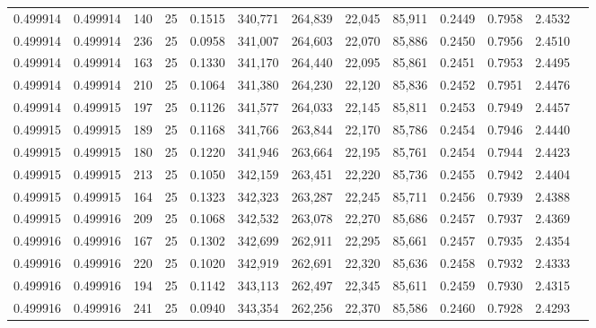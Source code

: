 \begin{tabular}{rrrrrrrrrrrrr}
0.499914 & 0.499914 &   140 &  25 &                                     0.1515 & 340,771 & 264,839 &  22,045 &  85,911 & 0.2449 & 0.7958 & 2.4532 \\
0.499914 & 0.499914 &   236 &  25 &                                     0.0958 & 341,007 & 264,603 &  22,070 &  85,886 & 0.2450 & 0.7956 & 2.4510 \\
0.499914 & 0.499914 &   163 &  25 &                                     0.1330 & 341,170 & 264,440 &  22,095 &  85,861 & 0.2451 & 0.7953 & 2.4495 \\
0.499914 & 0.499914 &   210 &  25 &                                     0.1064 & 341,380 & 264,230 &  22,120 &  85,836 & 0.2452 & 0.7951 & 2.4476 \\
0.499914 & 0.499915 &   197 &  25 &                                     0.1126 & 341,577 & 264,033 &  22,145 &  85,811 & 0.2453 & 0.7949 & 2.4457 \\
0.499915 & 0.499915 &   189 &  25 &                                     0.1168 & 341,766 & 263,844 &  22,170 &  85,786 & 0.2454 & 0.7946 & 2.4440 \\
0.499915 & 0.499915 &   180 &  25 &                                     0.1220 & 341,946 & 263,664 &  22,195 &  85,761 & 0.2454 & 0.7944 & 2.4423 \\
0.499915 & 0.499915 &   213 &  25 &                                     0.1050 & 342,159 & 263,451 &  22,220 &  85,736 & 0.2455 & 0.7942 & 2.4404 \\
0.499915 & 0.499915 &   164 &  25 &                                     0.1323 & 342,323 & 263,287 &  22,245 &  85,711 & 0.2456 & 0.7939 & 2.4388 \\
0.499915 & 0.499916 &   209 &  25 &                                     0.1068 & 342,532 & 263,078 &  22,270 &  85,686 & 0.2457 & 0.7937 & 2.4369 \\
0.499916 & 0.499916 &   167 &  25 &                                     0.1302 & 342,699 & 262,911 &  22,295 &  85,661 & 0.2457 & 0.7935 & 2.4354 \\
0.499916 & 0.499916 &   220 &  25 &                                     0.1020 & 342,919 & 262,691 &  22,320 &  85,636 & 0.2458 & 0.7932 & 2.4333 \\
0.499916 & 0.499916 &   194 &  25 &                                     0.1142 & 343,113 & 262,497 &  22,345 &  85,611 & 0.2459 & 0.7930 & 2.4315 \\
0.499916 & 0.499916 &   241 &  25 &                                     0.0940 & 343,354 & 262,256 &  22,370 &  85,586 & 0.2460 & 0.7928 & 2.4293 \\

\end{tabular}
